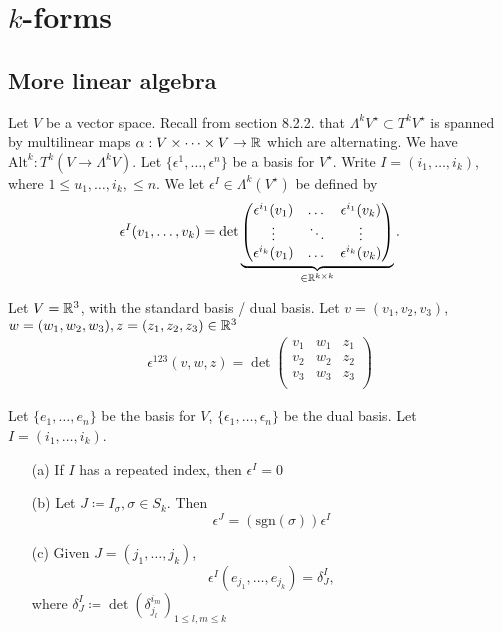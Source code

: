 \section{\(k\)-forms}

\subsection{More linear algebra}

Let \(V\) be a vector space. Recall from section 8.2.2. %
 that \(\Lambda^k V^\star \subset T^k V^\star\) is spanned by 
multilinear maps \(\alpha:V\times \dots\times V\to\mathbb{R}\) which are alternating. We have \(\text{Alt}^k:T^k(V\to \Lambda^k V)\).
Let \(\{\epsilon^1,\dots,\epsilon^n\}\) be a basis for \(V^\star\). Write \(I=(i_1,\dots,i_k)\), where 
\(1\leq u_1,\dots,i_k,\leq n\). We let \(\epsilon^I\in \Lambda^k(V^\star)\) be defined by 
\[\epsilon^I(v_1,\dots,v_k)=\det\underbrace{\begin{pmatrix}
    \epsilon^{i_1}(v_1) & \dots & \epsilon^{i_1}(v_k)\\
    \vdots & \ddots & \vdots \\
    \epsilon^{i_k}(v_1) &\dots & \epsilon^{i_k}(v_k)
\end{pmatrix}}_{\in\mathbb{R}^{k\times k}}.\]


\begin{example}
    Let \(V=\mathbb{R}^3\), with the standard basis / dual basis. Let \(v=(v_1,v_2,v_3)\), 
    \(w=(w_1,w_2,w_3), z=(z_1,z_2,z_3)\in \mathbb{R}^3\)
    \begin{align*}
        \epsilon^{123}(v,w,z)=\det \begin{pmatrix}
            v_1 &w_1 &z_1\\
            v_2 &w_2 &z_2\\
            v_3 &w_3 &z_3\\
        \end{pmatrix}
    \end{align*}
\end{example}

\begin{lemma}\label{lem:10.6}
    Let \(\{e_1,\dots,e_n\}\) be the basis for \(V\), \(\{\epsilon_1,\dots,\epsilon_n\}\) be the dual basis.
    Let \(I=(i_1,\dots,i_k)\).
    \begin{enumerate}
        \item[(a)] If \(I\) has a repeated index, then \(\epsilon^I=0\)
        \item[(b)] Let \(J\coloneqq I_\sigma,\sigma\in S_k\). Then \[\epsilon^J=(\text{sgn}(\sigma))\epsilon^I\]
        \item[(c)] Given \(J=(j_1,\dots,j_k)\), \[\epsilon^I(e_{j_1},\dots,e_{j_k})=\delta_J^I,\] where \(\delta_J^I\coloneqq \det(\delta_{j_l}^{i_m})_{1\leq l,m\leq k}\)  
    \end{enumerate}
\end{lemma}

